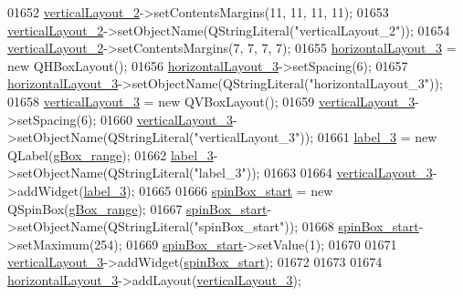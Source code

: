 \begin{DoxyCode}
01652         \hyperlink{a00027_a0c01bad60d9f422a1258e710635a2f65}{verticalLayout\_2}->setContentsMargins(11, 11, 11, 11);
01653         \hyperlink{a00027_a0c01bad60d9f422a1258e710635a2f65}{verticalLayout\_2}->setObjectName(QStringLiteral(\textcolor{stringliteral}{"verticalLayout\_2"}));
01654         \hyperlink{a00027_a0c01bad60d9f422a1258e710635a2f65}{verticalLayout\_2}->setContentsMargins(7, 7, 7, 7);
01655         \hyperlink{a00027_a03ce63974cc69b067c91bbf285cceca8}{horizontalLayout\_3} = \textcolor{keyword}{new} QHBoxLayout();
01656         \hyperlink{a00027_a03ce63974cc69b067c91bbf285cceca8}{horizontalLayout\_3}->setSpacing(6);
01657         \hyperlink{a00027_a03ce63974cc69b067c91bbf285cceca8}{horizontalLayout\_3}->setObjectName(QStringLiteral(\textcolor{stringliteral}{"horizontalLayout\_3"}));
01658         \hyperlink{a00027_a38b8a4b887f3b58e2a49e7905ae6f1f0}{verticalLayout\_3} = \textcolor{keyword}{new} QVBoxLayout();
01659         \hyperlink{a00027_a38b8a4b887f3b58e2a49e7905ae6f1f0}{verticalLayout\_3}->setSpacing(6);
01660         \hyperlink{a00027_a38b8a4b887f3b58e2a49e7905ae6f1f0}{verticalLayout\_3}->setObjectName(QStringLiteral(\textcolor{stringliteral}{"verticalLayout\_3"}));
01661         \hyperlink{a00027_a0376fd90247280e7c7957cc70628708c}{label\_3} = \textcolor{keyword}{new} QLabel(\hyperlink{a00027_a3c12d0504a310784c3820d1a9ad469c2}{gBox\_range});
01662         \hyperlink{a00027_a0376fd90247280e7c7957cc70628708c}{label\_3}->setObjectName(QStringLiteral(\textcolor{stringliteral}{"label\_3"}));
01663 
01664         \hyperlink{a00027_a38b8a4b887f3b58e2a49e7905ae6f1f0}{verticalLayout\_3}->addWidget(\hyperlink{a00027_a0376fd90247280e7c7957cc70628708c}{label\_3});
01665 
01666         \hyperlink{a00027_acb4d6609c580645dac5aee1f1ad59d01}{spinBox\_start} = \textcolor{keyword}{new} QSpinBox(\hyperlink{a00027_a3c12d0504a310784c3820d1a9ad469c2}{gBox\_range});
01667         \hyperlink{a00027_acb4d6609c580645dac5aee1f1ad59d01}{spinBox\_start}->setObjectName(QStringLiteral(\textcolor{stringliteral}{"spinBox\_start"}));
01668         \hyperlink{a00027_acb4d6609c580645dac5aee1f1ad59d01}{spinBox\_start}->setMaximum(254);
01669         \hyperlink{a00027_acb4d6609c580645dac5aee1f1ad59d01}{spinBox\_start}->setValue(1);
01670 
01671         \hyperlink{a00027_a38b8a4b887f3b58e2a49e7905ae6f1f0}{verticalLayout\_3}->addWidget(\hyperlink{a00027_acb4d6609c580645dac5aee1f1ad59d01}{spinBox\_start});
01672 
01673 
01674         \hyperlink{a00027_a03ce63974cc69b067c91bbf285cceca8}{horizontalLayout\_3}->addLayout(\hyperlink{a00027_a38b8a4b887f3b58e2a49e7905ae6f1f0}{verticalLayout\_3});

\end{DoxyCode}
